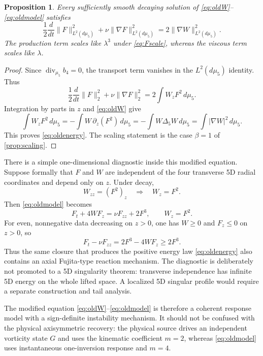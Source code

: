 \documentclass[11pt]{article}
\newtheorem{proposition}[theorem]{Proposition}
\theoremstyle{definition}
\begin{document}
\begin{proposition}\label{prop:oldenergy}
Every sufficiently smooth decaying solution of \eqref{eq:oldW}--\eqref{eq:oldmodel} satisfies
\begin{equation}\label{eq:oldenergy}
 \frac12\frac{d}{dt}\|F\|_{L^2(d\mu_5)}^2
 +\nu\|\nabla F\|_{L^2(d\mu_5)}^2
 =2\|\nabla W\|_{L^2(d\mu_5)}^2.
\end{equation}
The production term scales like $\lambda^3$ under \eqref{eq:Fscale}, whereas the viscous term scales like $\lambda$.
\end{proposition}

\begin{proof}
Since $\operatorname{div}_{\mu_5}b_4=0$, the transport term vanishes in the $L^2(d\mu_5)$ identity.  Thus
\[
 \frac12\frac{d}{dt}\|F\|_2^2+\nu\|\nabla F\|_2^2
 =2\int W_zF^2\,d\mu_5.
\]
Integration by parts in $z$ and \eqref{eq:oldW} give
\[
 \int W_zF^2\,d\mu_5
 =-\int W\,\partial_z(F^2)\,d\mu_5
 =-\int W\Delta_5W\,d\mu_5
 =\int|\nabla W|^2\,d\mu_5.
\]
This proves \eqref{eq:oldenergy}.  The scaling statement is the case $\beta=1$ of \cref{prop:scaling}.
\end{proof}

There is a simple one-dimensional diagnostic inside this modified equation.  Suppose formally that $F$ and $W$ are independent of the four transverse 5D radial coordinates and depend only on $z$.  Under decay,
\[
 W_{zz}=(F^2)_z
 \quad\Longrightarrow\quad
 W_z=F^2.
\]
Then \eqref{eq:oldmodel} becomes
\begin{equation}\label{eq:axialdiag}
 F_t+4WF_z=\nu F_{zz}+2F^3,
 \qquad W_z=F^2.
\end{equation}
For even, nonnegative data decreasing on $z>0$, one has $W\ge0$ and $F_z\le0$ on $z>0$, so
\[
 F_t-\nu F_{zz}=2F^3-4WF_z\ge2F^3.
\]
Thus the same closure that produces the positive energy law \eqref{eq:oldenergy} also contains an axial Fujita-type reaction mechanism.  The diagnostic is deliberately not promoted to a 5D singularity theorem: transverse independence has infinite 5D energy on the whole lifted space.  A localized 5D singular profile would require a separate construction and tail analysis.

The modified equation \eqref{eq:oldW}--\eqref{eq:oldmodel} is therefore a coherent response model with a sign-definite instability mechanism.  It should not be confused with the physical axisymmetric recovery: the physical source drives an independent vorticity state $G$ and uses the kinematic coefficient $m=2$, whereas \eqref{eq:oldmodel} uses instantaneous one-inversion response and $m=4$.
\end{document}
